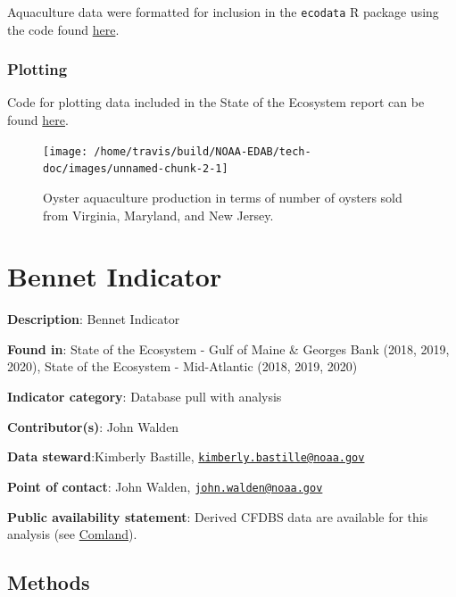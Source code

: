 \documentclass[
]{book}
\begin{document}
Aquaculture data were formatted for inclusion in the \texttt{ecodata} R package using the code found \href{https://github.com/NOAA-EDAB/ecodata/blob/master/data-raw/get_aquaculture.R}{here}.

\hypertarget{plotting}{%
\subsection{Plotting}\label{plotting}}

Code for plotting data included in the State of the Ecosystem report can be found \href{https://github.com/NOAA-EDAB/ecodata/blob/master/chunk-scripts/human_dimensions.Rmd-oyster-aqua.R}{here}.

\begin{figure}

{\centering \texttt{[image: /home/travis/build/NOAA-EDAB/tech-doc/images/unnamed-chunk-2-1]} 

}

\caption{Oyster aquaculture production in terms of number of oysters sold from Virginia, Maryland, and New Jersey.}\label{fig:unnamed-chunk-2}
\end{figure}

\hypertarget{bennet-indicator}{%
\chapter{Bennet Indicator}\label{bennet-indicator}}

\textbf{Description}: Bennet Indicator

\textbf{Found in}: State of the Ecosystem - Gulf of Maine \& Georges Bank (2018, 2019, 2020), State of the Ecosystem - Mid-Atlantic (2018, 2019, 2020)

\textbf{Indicator category}: Database pull with analysis

\textbf{Contributor(s)}: John Walden

\textbf{Data steward}:Kimberly Bastille, \href{mailto:kimberly.bastille@noaa.gov}{\nolinkurl{kimberly.bastille@noaa.gov}}

\textbf{Point of contact}: John Walden, \href{mailto:john.walden@noaa.gov}{\nolinkurl{john.walden@noaa.gov}}

\textbf{Public availability statement}: Derived CFDBS data are available for this analysis (see \protect\hyperlink{comdat}{Comland}).

\hypertarget{methods-3}{%
\section{Methods}\label{methods-3}}
\end{document}
